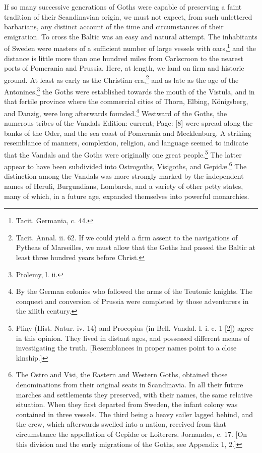 If so many successive generations of Goths were capable of preserving a faint tradition of their Scandinavian origin, we must not expect, from such unlettered barbarians, any distinct account of the time and circumstances of their emigration. To cross the Baltic was an easy and natural attempt. The inhabitants of Sweden were masters of a sufficient number of large vessels with oars,\footnote{Tacit. Germania, c. 44.} and the distance is little more than one hundred miles from Carlscroon to the nearest ports of Pomerania and Prussia. Here, at length, we land on firm and historic ground. At least as early as the Christian era,\footnote{Tacit. Annal. ii. 62. If we could yield a firm assent to the navigations of Pytheas of Marseilles, we must allow that the Goths had passed the Baltic at least three hundred years before Christ.} and as late as the age of the Antonines,\footnote{Ptolemy, l. ii.} the Goths were established towards the mouth of the Vistula, and in that fertile province where the commercial cities of Thorn, Elbing, Königsberg, and Danzig, were long afterwards founded.\footnote{By the German colonies who followed the arms of the Teutonic knights. The conquest and conversion of Prussia were completed by those adventurers in the xiiith century.} Westward of the Goths, the numerous tribes of the Vandals Edition: current; Page: [8] were spread along the banks of the Oder, and the sea coast of Pomerania and Mecklenburg. A striking resemblance of manners, complexion, religion, and language seemed to indicate that the Vandals and the Goths were originally one great people.\footnote{Pliny (Hist. Natur. iv. 14) and Procopius (in Bell. Vandal. l. i. c. 1 [2]) agree in this opinion. They lived in distant ages, and possessed different means of investigating the truth. [Resemblances in proper names point to a close kinship.]} The latter appear to have been subdivided into Ostrogoths, Visigoths, and Gepidæ.\footnote{The Ostro and Visi, the Eastern and Western Goths, obtained those denominations from their original seats in Scandinavia. In all their future marches and settlements they preserved, with their names, the same relative situation. When they first departed from Sweden, the infant colony was contained in three vessels. The third being a heavy sailer lagged behind, and the crew, which afterwards swelled into a nation, received from that circumstance the appellation of Gepidæ or Loiterers. Jornandes, c. 17. [On this division and the early migrations of the Goths, see Appendix 1, 2.]} The distinction among the Vandals was more strongly marked by the independent names of Heruli, Burgundians, Lombards, and a variety of other petty states, many of which, in a future age, expanded themselves into powerful monarchies.


